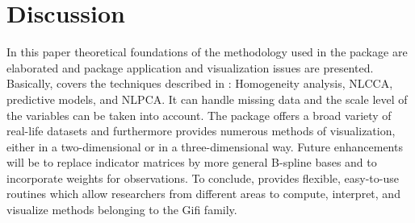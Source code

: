 \documentclass[10pt,nojss,nofooter,fleqn]{jss}\usepackage[]{graphicx}\usepackage[]{color}
\begin{document}
\section{Discussion}
In this paper theoretical foundations of the methodology used in the  package are elaborated and package application and visualization issues are presented. Basically,  covers the techniques described in \citet{Gifi:90}: Homogeneity analysis, NLCCA, predictive models, and NLPCA. It can handle missing data and the scale level of the variables can be taken into account. The package offers a broad variety of real-life datasets and furthermore provides numerous methods of visualization, either in a two-dimensional or in a three-dimensional way. Future enhancements will be to replace indicator matrices by more general B-spline bases and to incorporate weights for observations. To conclude,  provides flexible, easy-to-use routines which allow researchers from different areas to compute, interpret, and visualize methods belonging to the Gifi family. 


\end{document}
